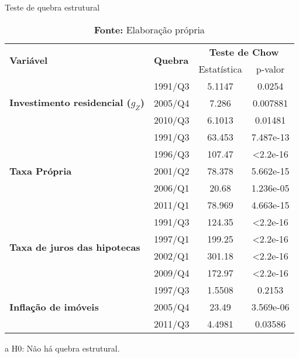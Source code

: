 \begin{table}[htb]
	\centering
	\caption{Teste de quebra estrutural}
	\label{structbreak}
	\begin{threeparttable}
		\begin{tabular}{l|l|cc}
			\hline \hline
			\multirow{2}{*}{\textbf{Variável}} & \multirow{2}{*}{\textbf{Quebra}} & \multicolumn{2}{c}{\textbf{Teste de Chow}\tnote{a}} \\ \cline{3-4} 
			&& Estatística & p-valor \\ \hline
			\multirow{3}{*}{\textbf{Investimento residencial ($g_Z$)}} & 1991/Q3 & 5.1147 & 0.0254 \\
			& 2005/Q4 & 7.286 & 0.007881 \\
			& 2010/Q3 & 6.1013 & 0.01481 \\ \hline
			\multirow{5}{*}{\textbf{Taxa Própria}} & 1991/Q3 & 63.453 & 7.487e-13 \\
			& 1996/Q3 & 107.47 & \textless 2.2e-16 \\
			& 2001/Q2 & 78.378 & 5.662e-15 \\
			& 2006/Q1 & 20.68 & 1.236e-05 \\
			& 2011/Q1 & 78.969 & 4.663e-15 \\ \hline
			\multirow{4}{*}{\textbf{Taxa de juros das hipotecas}} & 1991/Q3 & 124.35 & \textless 2.2e-16 \\
			& 1997/Q1 & 199.25 & \textless 2.2e-16 \\
			& 2002/Q1 & 301.18 & \textless 2.2e-16 \\
			& 2009/Q4 & 172.97 & \textless 2.2e-16 \\ \hline
			\multirow{3}{*}{\textbf{Inflação de imóveis}} & 1997/Q3 & 1.5508 & 0.2153 \\
			& 2005/Q4 & 23.49 & 3.569e-06 \\
			& 2011/Q3 & 4.4981 & 0.03586 \\ 
			\hline \hline
		\end{tabular}%
	\begin{tablenotes}\footnotesize
		\item [a] H0: Não há quebra estrutural.
	\end{tablenotes}
\end{threeparttable}
	\caption*{\textbf{Fonte:} Elaboração própria}
\end{table}
